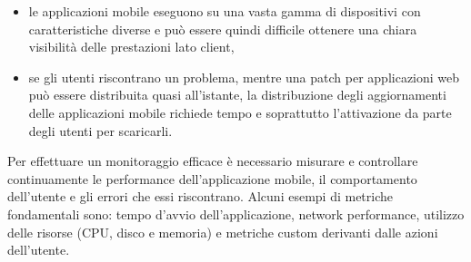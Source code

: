 \begin{itemize}
    \item le applicazioni mobile eseguono su una vasta gamma di dispositivi con caratteristiche diverse e può essere quindi difficile ottenere una chiara visibilità delle prestazioni lato client,
    
    \item se gli utenti riscontrano un problema, mentre una patch per applicazioni web può essere distribuita quasi all'istante, la distribuzione degli aggiornamenti delle applicazioni mobile richiede tempo e soprattutto l'attivazione da parte degli utenti per scaricarli.
\end{itemize}

Per effettuare un monitoraggio efficace è necessario misurare e controllare continuamente le performance dell'applicazione mobile, 
il comportamento dell'utente e gli errori che essi riscontrano. 
Alcuni esempi di metriche fondamentali sono: 
tempo d'avvio dell'applicazione, 
network performance, 
utilizzo delle risorse (CPU, disco e memoria) e metriche custom derivanti dalle azioni dell'utente.